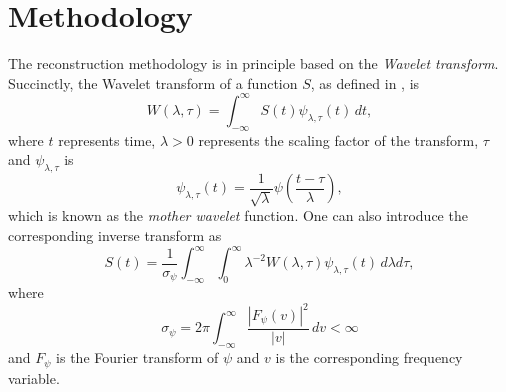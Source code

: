 \documentclass[10pt,letterpaper,conference]{ieeeconf}
\begin{document}
\section{Methodology}

The reconstruction methodology is in principle based on the \emph{Wavelet 
transform}. Succinctly, the Wavelet transform of a function $S$, as defined 
in \cite{Perica-Foufoula-Georgiou_96}, is 
\begin{equation*}
W(\lambda,\tau) = \int_{-\infty}^\infty S(t) \psi_{\lambda,\tau}(t) \,dt, 
\end{equation*}
where $t$ represents time, $\lambda>0$ represents the scaling factor of the 
transform, $\tau$ and $\psi_{\lambda,\tau}$ is 
\begin{equation*}
\psi_{\lambda,\tau}(t) = \frac{1}{\sqrt{\lambda}} 
\psi\left(\frac{t-\tau}{\lambda} \right),
\end{equation*}
which is known as the \emph{mother wavelet} function. One can also introduce 
the corresponding inverse transform as
\begin{equation*}
S(t) = \frac{1}{\sigma_{\psi}}\int_{-\infty}^\infty \int_{0}^\infty 
\lambda^{-2} W(\lambda,\tau) \psi_{\lambda,\tau}(t)\, d\lambda d\tau , 
\end{equation*}
where 
\begin{equation*}
\sigma_{\psi} = 2\pi \int_{-\infty}^\infty \frac{|F_{\psi}(v)|^2}{|v|}\, dv 
<\infty
\end{equation*}
and $F_{\psi}$ is the Fourier transform of $\psi$ and $v$ is the corresponding 
frequency variable.
\end{document}
